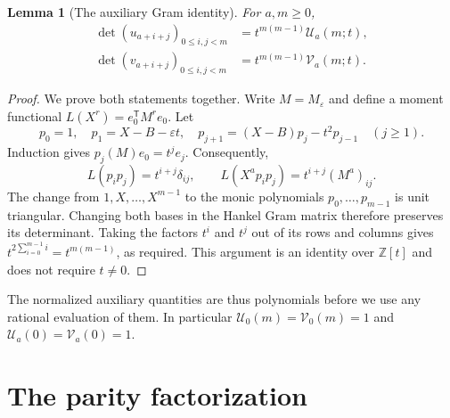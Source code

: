 \documentclass[11pt]{article}
\newtheorem{lemma}[theorem]{Lemma}
\theoremstyle{definition}
\theoremstyle{remark}
\newcommand{\Z}{\mathbb Z}
\newcommand{\U}{\mathcal U}
\newcommand{\V}{\mathcal V}
\newcommand{\eps}{\varepsilon}
\theoremstyle{definition}
\theoremstyle{plain}
\numberwithin{equation}{section}
\begin{document}
\begin{lemma}[The auxiliary Gram identity]
\label{lem:gram}
For $a,m\ge0$,
\begin{align}
 \det(u_{a+i+j})_{0\le i,j<m}&=t^{m(m-1)}\U_a(m;t),\label{eq:gram-u}\\
 \det(v_{a+i+j})_{0\le i,j<m}&=t^{m(m-1)}\V_a(m;t).\label{eq:gram-v}
\end{align}
\end{lemma}
\begin{proof}
We prove both statements together. Write $M=M_\eps$ and define a moment
functional $L(X^r)=e_0^{\mathsf T}M^re_0$. Let
\[
 p_0=1,\quad p_1=X-B-\eps t,\quad
 p_{j+1}=(X-B)p_j-t^2p_{j-1}\quad(j\ge1).
\]
Induction gives $p_j(M)e_0=t^j e_j$. Consequently,
\begin{equation}
 L(p_i p_j)=t^{i+j}\delta_{ij},\qquad
 L(X^a p_i p_j)=t^{i+j}(M^a)_{ij}.
 \label{eq:orthogonality}
\end{equation}
The change from $1,X,\ldots,X^{m-1}$ to the monic polynomials
$p_0,\ldots,p_{m-1}$ is unit triangular. Changing both bases in the Hankel
Gram matrix therefore preserves its determinant. Taking the factors $t^i$
and $t^j$ out of its rows and columns gives
$t^{2\sum_{i=0}^{m-1}i}=t^{m(m-1)}$, as required.
This argument is an identity over $\Z[t]$ and does not require $t\ne0$.
\end{proof}

The normalized auxiliary quantities are thus polynomials before we use any
rational evaluation of them. In particular $\U_0(m)=\V_0(m)=1$ and
$\U_a(0)=\V_a(0)=1$.

\section{The parity factorization}
\label{sec:factor}
\end{document}
